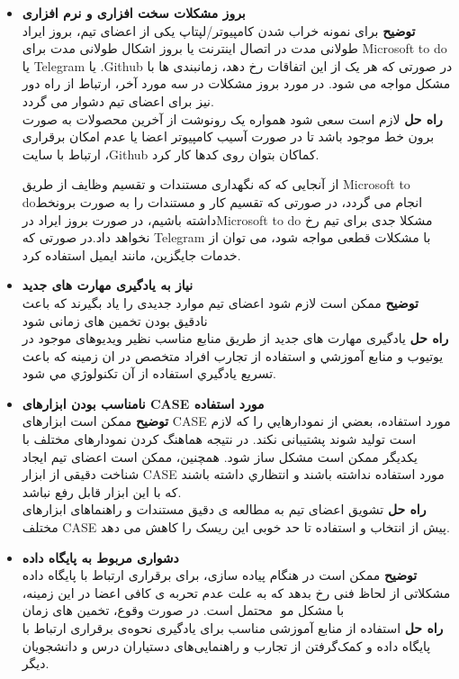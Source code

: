 
\begin{itemize}
\item \textbf{بروز مشکلات سخت افزاری و نرم افزاری}\\
\textbf{توضیح} برای نمونه خراب شدن کامپیوتر/لپتاپ یکی از اعضای تیم، بروز ایراد طولانی مدت در اتصال اینترنت یا بروز اشکال طولانی مدت برای Microsoft to do یا Telegram یا .Github در صورتی که هر یک از این اتفاقات رخ دهد، زمانبندی ها با مشکل مواجه می شود. در مورد بروز مشکلات در سه مورد آخر، ارتباط از راه دور نیز برای اعضای تیم دشوار می گردد.\\
\textbf{راه حل} لازم است سعی شود همواره یک رونوشت از آخرین محصولات به صورت برون خط موجود باشد تا در صورت آسیب کامپیوتر اعضا یا عدم امکان برقراری ارتباط با سایت ،Github کماکان بتوان روی کدها کار کرد.

از آنجایی که که نگهداری مستندات و تقسیم وظایف از طریق Microsoft to doانجام می گردد، در صورتی که تقسیم کار و مستندات را به صورت برونخط داشته باشیم، در صورت بروز ایراد درMicrosoft to do مشکلا جدی برای تیم رخ نخواهد داد.در صورتی که Telegram با مشکلات قطعی مواجه شود، می توان از خدمات جایگزین، مانند ایمیل استفاده کرد. 

\item \textbf{نیاز به یادگیری مهارت های جدید}\\
\textbf{توضیح} ممکن است لازم شود اعضای تیم موارد جدیدی را یاد بگیرند که باعث نادقیق بودن تخمین های زمانی شود\\
\textbf{راه حل}  یادگیری مهارت های جدید از طريق منابع مناسب نظير ويديوهای موجود در يوتيوب و منابع آموزشي و استفاده از تجارب افراد متخصص در ان زمينه كه باعث تسريع يادگيري استفاده از آن تكنولوژي مي شود. 

\item \textbf{نامناسب بودن ابزارهای CASE مورد استفاده}\\
\textbf{توضيح} ممكن است ابزارهای CASE مورد استفاده، بعضي از نمودارهایي را كه لازم است توليد شوند پشتيبانی نكند. در نتيجه هماهنگ كردن نمودارهای مختلف با يكديگر ممكن است مشكل ساز شود. همچنين، ممكن است اعضای تيم ايجاد شناخت دقيقی از ابزار CASE مورد استفاده نداشته باشند و انتظاري داشته باشند كه با اين ابزار قابل رفع نباشد.\\
\textbf{راه حل} تشویق اعضای تیم به مطالعه ی دقیق مستندات و راهنماهای ابزارهای مختلف CASE پیش از انتخاب و استفاده تا حد خوبی این ریسک را کاهش می دهد. 

\item \textbf{دشواری مربوط به پایگاه داده}\\
\textbf{توضیح} ممکن است در هنگام پیاده سازی، برای برقراری ارتباط با پایگاه داده مشکلاتی از لحاظ فنی رخ بدهد که به علت عدم تحربه ی کافی اعضا در این زمینه، محتمل است. در صورت وقوع، تخمین های زمان􏰀 با مشکل مو\\
\textbf{راه حل}  استفاده از منابع آموزشی مناسب برای یادگیری نحوه‌ی برقراری ارتباط با پایگاه داده و کمک‌گرفتن از تجارب و راهنمایی‌های دستیاران درس و دانشجویان دیگر.
\end{itemize}